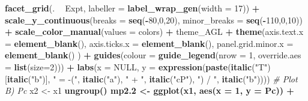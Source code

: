 \documentclass[
]{article}
\newenvironment{Shaded}{\begin{snugshade}}{\end{snugshade}}
\newcommand{\CommentTok}[1]{\textcolor[rgb]{0.56,0.35,0.01}{\textit{#1}}}
\newcommand{\DataTypeTok}[1]{\textcolor[rgb]{0.13,0.29,0.53}{#1}}
\newcommand{\DecValTok}[1]{\textcolor[rgb]{0.00,0.00,0.81}{#1}}
\newcommand{\FloatTok}[1]{\textcolor[rgb]{0.00,0.00,0.81}{#1}}
\newcommand{\KeywordTok}[1]{\textcolor[rgb]{0.13,0.29,0.53}{\textbf{#1}}}
\newcommand{\NormalTok}[1]{#1}
\newcommand{\OperatorTok}[1]{\textcolor[rgb]{0.81,0.36,0.00}{\textbf{#1}}}
\newcommand{\OtherTok}[1]{\textcolor[rgb]{0.56,0.35,0.01}{#1}}
\newcommand{\StringTok}[1]{\textcolor[rgb]{0.31,0.60,0.02}{#1}}
\begin{document}
\begin{Shaded}
\begin{Highlighting}[]
{{{{{{{{{{{{\StringTok{  }\KeywordTok{facet_grid}\NormalTok{(. }\OperatorTok{~}\StringTok{ }\NormalTok{Expt, }\DataTypeTok{labeller =} \KeywordTok{label_wrap_gen}\NormalTok{(}\DataTypeTok{width =} \DecValTok{17}\NormalTok{)) }\OperatorTok{+}
\StringTok{  }\KeywordTok{scale_y_continuous}\NormalTok{(}\DataTypeTok{breaks =} \KeywordTok{seq}\NormalTok{(}\OperatorTok{-}\DecValTok{80}\NormalTok{,}\DecValTok{0}\NormalTok{,}\DecValTok{20}\NormalTok{), }\DataTypeTok{minor_breaks =} \KeywordTok{seq}\NormalTok{(}\OperatorTok{-}\DecValTok{110}\NormalTok{,}\DecValTok{0}\NormalTok{,}\DecValTok{10}\NormalTok{)) }\OperatorTok{+}
\StringTok{  }\KeywordTok{scale_color_manual}\NormalTok{(}\DataTypeTok{values =}\NormalTok{ colors) }\OperatorTok{+}
\StringTok{  }\NormalTok{theme_AGL }\OperatorTok{+}
\StringTok{  }\KeywordTok{theme}\NormalTok{(}\DataTypeTok{axis.text.x        =} \KeywordTok{element_blank}\NormalTok{(), }
        \DataTypeTok{axis.ticks.x       =} \KeywordTok{element_blank}\NormalTok{(),}
        \DataTypeTok{panel.grid.minor.x =} \KeywordTok{element_blank}\NormalTok{() ) }\OperatorTok{+}
\StringTok{  }\KeywordTok{guides}\NormalTok{(}\DataTypeTok{colour =} \KeywordTok{guide_legend}\NormalTok{(}\DataTypeTok{nrow =} \DecValTok{1}\NormalTok{, }\DataTypeTok{override.aes =} \KeywordTok{list}\NormalTok{(}\DataTypeTok{size=}\DecValTok{2}\NormalTok{))) }\OperatorTok{+}
\StringTok{  }\KeywordTok{labs}\NormalTok{(}\DataTypeTok{x =} \OtherTok{NULL}\NormalTok{,}
       \DataTypeTok{y =} \KeywordTok{expression}\NormalTok{(}\KeywordTok{paste}\NormalTok{(}\KeywordTok{italic}\NormalTok{(}\StringTok{"T"}\NormalTok{)[}\KeywordTok{italic}\NormalTok{(}\StringTok{"b"}\NormalTok{)], }\StringTok{" = -("}\NormalTok{, }\KeywordTok{italic}\NormalTok{(}\StringTok{"a"}\NormalTok{), }\StringTok{" + "}\NormalTok{,}
                            \KeywordTok{italic}\NormalTok{(}\StringTok{"cP"}\NormalTok{), }\StringTok{") / "}\NormalTok{, }\KeywordTok{italic}\NormalTok{(}\StringTok{"b"}\NormalTok{))))}
\CommentTok{# Plot B) Pc}
\NormalTok{x2 <-}\StringTok{ }\NormalTok{x1 }\OperatorTok{%
\StringTok{  }\KeywordTok{ungroup}\NormalTok{() }\OperatorTok{%
\NormalTok{mp2}\FloatTok{.2}\NormalTok{ <-}\StringTok{ }\KeywordTok{ggplot}\NormalTok{(x1, }\KeywordTok{aes}\NormalTok{(}\DataTypeTok{x =} \DecValTok{1}\NormalTok{, }\DataTypeTok{y =}\NormalTok{ Pc)) }\OperatorTok{+}\StringTok{ }
}}}}}}}}}}}}}}
\end{Highlighting}
\end{Shaded}
\end{document}
